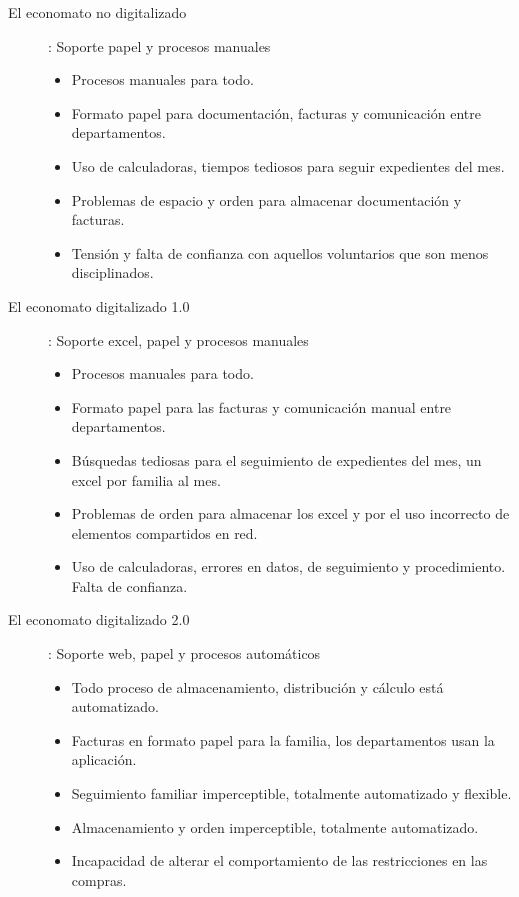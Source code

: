 \begin{description}
  \item[El economato no digitalizado]: Soporte papel y procesos manuales
  \begin{itemize}
      \item Procesos manuales para todo.
      \item Formato papel para documentación, facturas y comunicación entre departamentos.
      \item Uso de calculadoras, tiempos tediosos para seguir expedientes del mes.
      \item Problemas de espacio y orden para almacenar documentación y facturas.
      \item Tensión y falta de confianza con aquellos voluntarios que son menos disciplinados.
  \end{itemize}
  \item[El economato digitalizado 1.0]: Soporte excel, papel y procesos manuales
  \begin{itemize}
      \item Procesos manuales para todo.
      \item Formato papel para las facturas y comunicación manual entre departamentos.
      \item Búsquedas tediosas para el seguimiento de expedientes del mes, un excel por familia al mes.
      \item Problemas de orden para almacenar los excel y por el uso incorrecto de elementos compartidos en red.
      \item Uso de calculadoras, errores en datos, de seguimiento y procedimiento. Falta de confianza.
  \end{itemize}
  \item[El economato digitalizado 2.0]: Soporte web, papel y procesos automáticos
  \begin{itemize}
      \item Todo proceso de almacenamiento, distribución y cálculo está automatizado.
      \item Facturas en formato papel para la familia, los departamentos usan la aplicación.
      \item Seguimiento familiar imperceptible, totalmente automatizado y flexible.
      \item Almacenamiento y orden imperceptible, totalmente automatizado.
      \item Incapacidad de alterar el comportamiento de las restricciones en las compras.
  \end{itemize}
\end{description}
\clearpage

